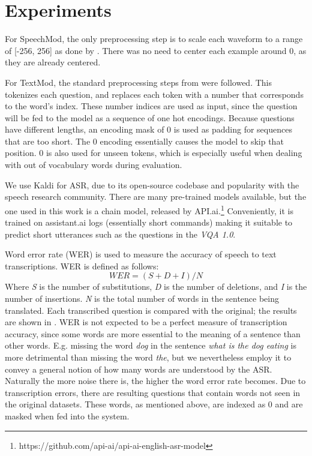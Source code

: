 \documentclass[letterpaper]{article} %
\begin{document}
\section{Experiments}
\label{sec:experiment}
For SpeechMod, the only preprocessing step is to scale each waveform to a range of [-256, 256] as done by \cite{soundnet}. There was no need to center each example around 0, as they are already centered.

For TextMod, the standard preprocessing steps from \cite{VQA} were followed. This tokenizes each question, and replaces each token with a number that corresponds to the word’s index. These number indices are used as input, since the question will be fed to the model as a sequence of one hot encodings. Because questions have different lengths, an encoding mask of 0 is used as padding for sequences that are too short. The 0 encoding essentially causes the model to skip that position. 0 is also used for unseen tokens, which is especially useful when dealing with out of vocabulary words during evaluation.

We use Kaldi \cite{kaldi} for ASR, due to its open-source codebase and popularity with the speech research community. There are many pre-trained models available, but the one used in this work is a chain model, released by API.ai.\footnote{https://github.com/api-ai/api-ai-english-asr-model} Conveniently, it is trained on assistant.ai logs (essentially short commands) making it suitable to predict short utterances such as the questions in the \textit{VQA 1.0}.

Word error rate (WER) is used to measure the accuracy of speech to text transcriptions. WER is defined as follows: 
\begin{displaymath}
  \mathit{WER} = (S+D+I)/N
\end{displaymath}
Where \textit{S} is the number of substitutions, \textit{D} is the number of deletions, and \textit{I} is the number of insertions. \textit{N} is the total number of words in the sentence being translated. Each transcribed question is compared with the original; the results are shown in . WER is not expected to be a perfect measure of transcription accuracy, since some words are more essential to the meaning of a sentence than other words. E.g. missing the word \emph{dog} in the sentence \emph{what is the dog eating} is more detrimental than missing the word \emph{the}, but we nevertheless employ it to convey a general notion of how many words are understood by the ASR. Naturally the more noise there is, the higher the word error rate becomes. Due to transcription errors, there are resulting questions that contain words not seen in the original datasets. These words, as mentioned above, are indexed as 0 and are masked when fed into the system.
\end{document}
